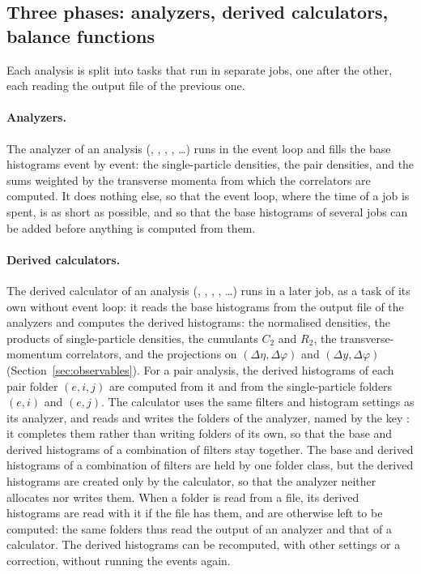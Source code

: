 \subsection{Three phases: analyzers, derived calculators, balance functions}
\label{sec:phases}

Each analysis is split into tasks that run in separate jobs, one after the other, each reading the output file of the
previous one.

\paragraph{Analyzers.}
The analyzer of an analysis (, , ,
, \dots) runs in the event loop and fills the base histograms event by event: the single-particle
densities, the pair densities, and the sums weighted by the transverse momenta from which the correlators are computed.
It does nothing else, so that the event loop, where the time of a job is spent, is as short as possible, and so that
the base histograms of several jobs can be added before anything is computed from them.

\paragraph{Derived calculators.}
The derived calculator of an analysis (, ,
, , \dots) runs in a later job, as a task of its
own without event loop: it reads the base histograms from the output file of the analyzers and computes the
derived histograms: the normalised densities, the products of single-particle densities, the cumulants $C_2$ and
$R_2$, the transverse-momentum correlators, and the projections on $(\Delta\eta,\Delta\varphi)$ and
$(\Delta y,\Delta\varphi)$ (Section~\ref{sec:observables}). For a pair analysis, the derived histograms of each pair folder $(e, i, j)$ are computed from it and from the single-particle folders $(e, i)$ and $(e, j)$. The calculator uses
the same filters and histogram settings as its analyzer, and reads and writes the folders of the analyzer, named by
the key : it completes them rather than writing folders of its own, so that the base and derived
histograms of a combination of filters stay together. The base and derived histograms of a combination of filters are
held by one folder class, but the derived histograms are created only by the calculator, so that the analyzer neither
allocates nor writes them. When a folder is read from a file, its derived histograms are read with it if the file has
them, and are otherwise left to be computed: the same folders thus read the output of an analyzer and that of a
calculator. The derived histograms can be recomputed, with other settings or a correction, without running the events
again.

